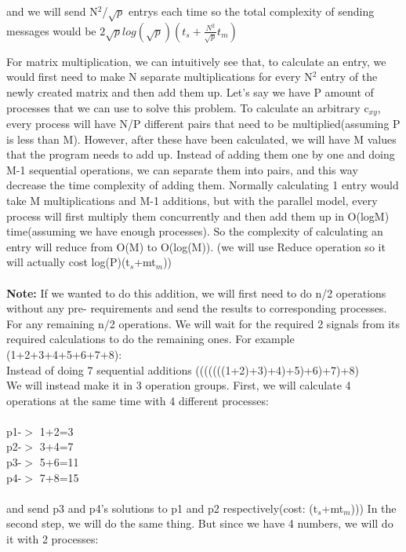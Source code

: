 and we will send N$^2$/$\sqrt{p}$ entrys each time so the total complexity of sending messages would be \(2\sqrt{p}log(\sqrt{p})(t_s+\frac{N^2}{\sqrt{p}}t_m)\)


For matrix multiplication, we can intuitively see that, to calculate an entry, we would first need to make N separate multiplications for every N$^2$ entry of the newly created matrix and then add them up. Let's say we have P amount of processes that we can use to solve this problem. To calculate an arbitrary c$_{xy}$, every process will have N/P different pairs that need to be multiplied(assuming P is less than M). However, after these have been calculated, we will have M values that the program needs to add up. Instead of adding them one by one and doing M-1 sequential operations, we can separate them into pairs, and this way decrease the time complexity of adding them. Normally calculating 1 entry would take M multiplications and M-1 additions, but with the parallel model, every process will first multiply them concurrently and then add them up in O(logM) time(assuming we have enough processes). So the complexity of calculating an entry will reduce from O(M) to O(log(M)). (we will use Reduce operation so it will actually cost log(P)(t$_s$+mt$_m$))\\
\\
\textbf{Note:} If we wanted to do this addition, we will first need to do n/2 operations without any pre-
requirements and send the results to corresponding processes. For any remaining n/2 operations. We will wait for the required 2 signals from its required calculations to do the remaining ones. For example (1+2+3+4+5+6+7+8):\\
Instead of doing 7 sequential additions (((((((1+2)+3)+4)+5)+6)+7)+8)\\
We will instead make it in 3 operation groups. First, we will calculate 4 operations at the same time with 4 different processes:\\
\\
p1-$>$ 1+2=3\\   
p2-$>$ 3+4=7\\   
p3-$>$ 5+6=11\\   
p4-$>$ 7+8=15\\
\\
and send p3 and p4's solutions to p1 and p2 respectively(cost: (t$_s$+mt$_m$)))
In the second step, we will do the same thing. But since we have 4 numbers, we will do it with 2 processes:\\
\\

